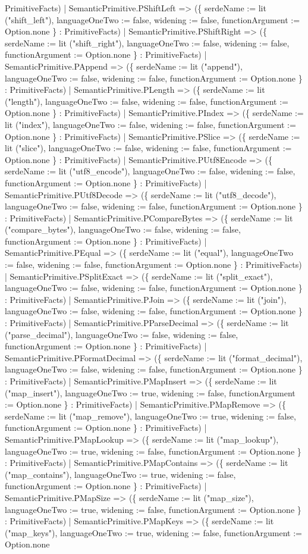 \documentclass[11pt]{article}
\begin{document}
PrimitiveFacts) | SemanticPrimitive.PShiftLeft => (\{ serdeName := lit ("shift\_left"), languageOneTwo := false, widening := false, functionArgument := Option.none \} : PrimitiveFacts) | SemanticPrimitive.PShiftRight => (\{ serdeName := lit ("shift\_right"), languageOneTwo := false, widening := false, functionArgument := Option.none \} : PrimitiveFacts) | SemanticPrimitive.PAppend => (\{ serdeName := lit ("append"), languageOneTwo := false, widening := false, functionArgument := Option.none \} : PrimitiveFacts) | SemanticPrimitive.PLength => (\{ serdeName := lit ("length"), languageOneTwo := false, widening := false, functionArgument := Option.none \} : PrimitiveFacts) | SemanticPrimitive.PIndex => (\{ serdeName := lit ("index"), languageOneTwo := false, widening := false, functionArgument := Option.none \} : PrimitiveFacts) | SemanticPrimitive.PSlice => (\{ serdeName := lit ("slice"), languageOneTwo := false, widening := false, functionArgument := Option.none \} : PrimitiveFacts) | SemanticPrimitive.PUtf8Encode => (\{ serdeName := lit ("utf8\_encode"), languageOneTwo := false, widening := false, functionArgument := Option.none \} : PrimitiveFacts) | SemanticPrimitive.PUtf8Decode => (\{ serdeName := lit ("utf8\_decode"), languageOneTwo := false, widening := false, functionArgument := Option.none \} : PrimitiveFacts) | SemanticPrimitive.PCompareBytes => (\{ serdeName := lit ("compare\_bytes"), languageOneTwo := false, widening := false, functionArgument := Option.none \} : PrimitiveFacts) | SemanticPrimitive.PEqual => (\{ serdeName := lit ("equal"), languageOneTwo := false, widening := false, functionArgument := Option.none \} : PrimitiveFacts) | SemanticPrimitive.PSplitExact => (\{ serdeName := lit ("split\_exact"), languageOneTwo := false, widening := false, functionArgument := Option.none \} : PrimitiveFacts) | SemanticPrimitive.PJoin => (\{ serdeName := lit ("join"), languageOneTwo := false, widening := false, functionArgument := Option.none \} : PrimitiveFacts) | SemanticPrimitive.PParseDecimal => (\{ serdeName := lit ("parse\_decimal"), languageOneTwo := false, widening := false, functionArgument := Option.none \} : PrimitiveFacts) | SemanticPrimitive.PFormatDecimal => (\{ serdeName := lit ("format\_decimal"), languageOneTwo := false, widening := false, functionArgument := Option.none \} : PrimitiveFacts) | SemanticPrimitive.PMapInsert => (\{ serdeName := lit ("map\_insert"), languageOneTwo := true, widening := false, functionArgument := Option.none \} : PrimitiveFacts) | SemanticPrimitive.PMapRemove => (\{ serdeName := lit ("map\_remove"), languageOneTwo := true, widening := false, functionArgument := Option.none \} : PrimitiveFacts) | SemanticPrimitive.PMapLookup => (\{ serdeName := lit ("map\_lookup"), languageOneTwo := true, widening := false, functionArgument := Option.none \} : PrimitiveFacts) | SemanticPrimitive.PMapContains => (\{ serdeName := lit ("map\_contains"), languageOneTwo := true, widening := false, functionArgument := Option.none \} : PrimitiveFacts) | SemanticPrimitive.PMapSize => (\{ serdeName := lit ("map\_size"), languageOneTwo := true, widening := false, functionArgument := Option.none \} : PrimitiveFacts) | SemanticPrimitive.PMapKeys => (\{ serdeName := lit ("map\_keys"), languageOneTwo := true, widening := false, functionArgument := Option.none 
\end{document}
